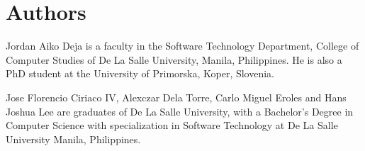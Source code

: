 \documentclass{sigchi-ext}
\begin{document}

\section{Authors}
Jordan Aiko Deja is a faculty in the Software Technology Department, College of Computer Studies of De La Salle University, Manila, Philippines. He is also a PhD student at the University of Primorska, Koper, Slovenia. 

Jose Florencio Ciriaco IV, Alexczar Dela Torre, Carlo Miguel Eroles and Hans Joshua Lee are graduates of De La Salle University, with a Bachelor's Degree in Computer Science with specialization in Software Technology at De La Salle University Manila, Philippines.






\end{document}

